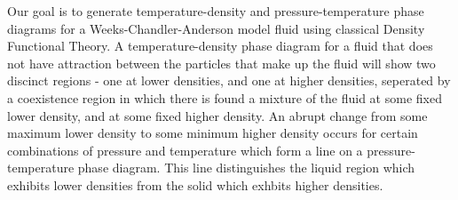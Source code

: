 \documentclass[double,12pt]{beavtex}
\begin{document}
%
%
%
  
Our goal is to generate temperature-density and pressure-temperature 
phase diagrams for a Weeks-Chandler-Anderson model fluid using 
classical Density Functional Theory. 
A temperature-density phase diagram for a fluid that does not
have attraction between the particles that make up the fluid will show
two discinct regions - one at lower densities, and one at higher densities,
seperated by a coexistence region in which there is found a mixture of the 
fluid at some fixed lower density, and at some fixed higher density. An 
abrupt change from some maximum lower density to some minimum higher density 
occurs for certain combinations of pressure and temperature which form
a line on a pressure-temperature phase diagram. This line distinguishes 
the liquid region which exhibits lower densities from the 
solid which exhbits higher densities. 
\end{document}
